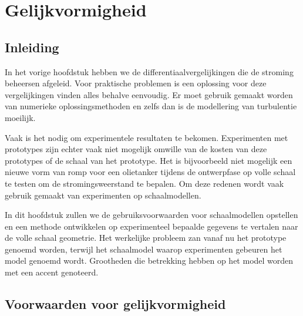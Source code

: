 \chapter{Gelijkvormigheid}
\label{sec:Gelijkvormigheid}

	\section{Inleiding}
	\label{sec:Gelijkvormigheid Inleiding}
In het vorige hoofdstuk hebben we de differentiaalvergelijkingen die de stroming beheersen afgeleid. Voor praktische problemen is een oplossing voor deze vergelijkingen vinden alles behalve eenvoudig. Er moet gebruik gemaakt worden van numerieke oplossingsmethoden en zelfs dan is de modellering van turbulentie moeilijk.

Vaak is het nodig om experimentele resultaten te bekomen. Experimenten met prototypes zijn echter vaak niet mogelijk omwille van de kosten van deze prototypes of de schaal van het prototype. Het is bijvoorbeeld niet mogelijk een nieuwe vorm van romp voor een olietanker tijdens de ontwerpfase op volle schaal te testen om de stromingsweerstand te bepalen. Om deze redenen wordt vaak gebruik gemaakt van experimenten op schaalmodellen.

In dit hoofdstuk zullen we de gebruiksvoorwaarden voor schaalmodellen opstellen en een methode ontwikkelen op experimenteel bepaalde gegevens te vertalen naar de volle schaal geometrie. Het werkelijke probleem zan vanaf nu het prototype genoemd worden, terwijl het schaalmodel waarop experimenten gebeuren het model genoemd wordt. Grootheden die betrekking hebben op het model worden met een accent genoteerd.

	\section{Voorwaarden voor gelijkvormigheid}
	\label{sec:Voorwaarden voor gelijkvormigheid}
